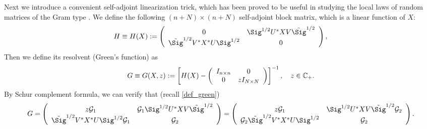 Next we introduce a convenient self-adjoint linearization trick, which has been proved to be useful in studying the local laws of random matrices of the Gram type \cite{Alt_Gram, AEK_Gram, Anisotropic, XYY_circular}. We define the following $(n+N)\times (n+N)$ self-adjoint block matrix, which is a linear function of $X$:
 \begin{equation}\label{linearize_block}
   H \equiv H(X): = \left( {\begin{array}{*{20}c}
   { 0 } & \Sig^{1/2} U^{*}X V\tilde \Sig^{1/2}   \\
   {\tilde\Sig^{1/2}V^*X^* U\Sig^{1/2} } & {0}  \\
   \end{array}} \right),
 \end{equation}
Then we define its resolvent (Green's function) as
 \begin{equation}\label{eqn_defG}
 G \equiv G (X,z):= \left[H(X)-\left( {\begin{array}{*{20}c}
   { I_{n\times n}} & 0  \\
   0 & { zI_{N\times N}}  \\
\end{array}} \right)\right]^{-1} , \quad z\in \mathbb C_+ .
 \end{equation}
By Schur complement formula, we can verify that (recall \eqref{def_green})
\begin{align} 
G = \left( {\begin{array}{*{20}c}
   { z\mathcal G_1} & \mathcal G_1 \Sig^{1/2} U^{*}X V\tilde \Sig^{1/2}  \\
   {\tilde\Sig^{1/2}V^*X^* U\Sig^{1/2} \mathcal G_1} & { \mathcal G_2 }  \\
\end{array}} \right) = \left( {\begin{array}{*{20}c}
   { z\mathcal G_1} & \Sig^{1/2} U^{*}X V\tilde \Sig^{1/2} \mathcal G_2   \\
   {\mathcal G_2}\tilde\Sig^{1/2}V^*X^* U\Sig^{1/2} & { \mathcal G_2 }  \\ 
\end{array}} \right). \label{green2}
\end{align}
